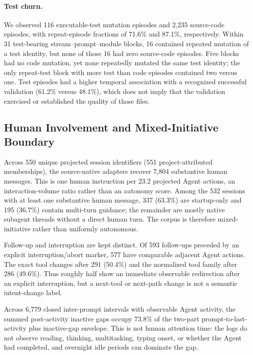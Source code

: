 \documentclass[letterpaper]{article}
\begin{document}
\paragraph{Test churn.}
We observed 116 executable-test mutation episodes and 2,235 source-code
episodes, with repeat-episode fractions of 71.6\% and 87.1\%, respectively.
Within 31 test-bearing stream--prompt--module blocks, 16 contained repeated
mutation of a test identity, but none of those 16 had zero source-code
episodes.  Five blocks had no code mutation, yet none repeatedly mutated the
same test identity; the only repeat-test block with more test than code
episodes contained two versus one.  Test episodes had a higher temporal
association with a recognized successful validation (61.2\% versus 48.1\%),
which does not imply that the validation exercised or established the quality
of those files.

\subsection{Human Involvement and Mixed-Initiative Boundary}

Across 550 unique projected session identifiers (551 project-attributed
memberships), the source-native adapters recover 7,804 substantive human
messages.  This is one human instruction per 23.2 projected Agent actions, an
interaction-volume ratio rather than an autonomy score.  Among the 532
sessions with at least one substantive human message, 337 (63.3\%) are
startup-only and 195 (36.7\%) contain multi-turn guidance; the remainder are
mostly native subagent threads without a direct human turn.  The corpus is
therefore mixed-initiative rather than uniformly autonomous.

Follow-up and interruption are kept distinct.  Of 593 follow-ups preceded by
an explicit interruption/abort marker, 577 have comparable adjacent Agent
actions.  The exact tool changes after 291 (50.4\%) and the normalized tool
family after 286 (49.6\%).  Thus roughly half show an immediate observable
redirection after an explicit interruption, but a next-tool or next-path
change is not a semantic intent-change label.

Across 6,779 closed inter-prompt intervals with observable Agent activity, the
summed post-activity inactive gaps occupy 73.8\% of the two-part
prompt-to-last-activity plus inactive-gap envelope.  This is not human
attention time: the logs do not observe reading, thinking, multitasking,
typing onset, or whether the Agent had completed, and overnight idle periods
can dominate the gap.
\end{document}
